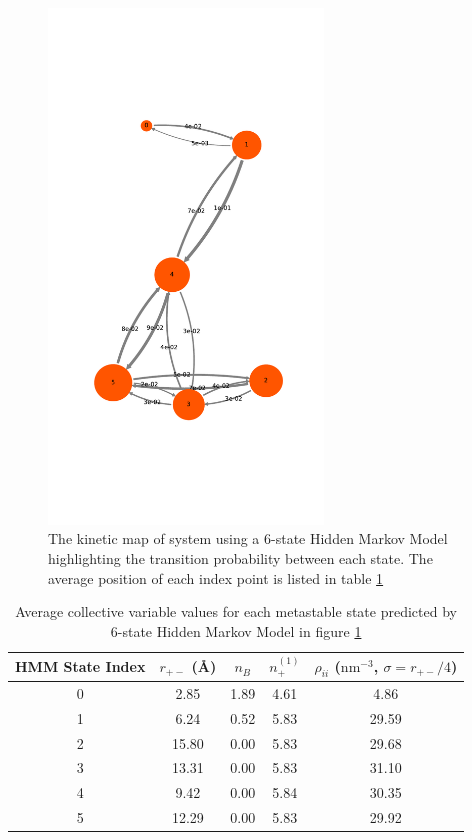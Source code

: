 \begin{spacing}{2.0}
    \begin{figure}[t]
        \centering
        \includegraphics[width=0.65\textwidth]{./figs/fig3-05}
        \caption{The kinetic map of  system using a 6-state Hidden Markov Model highlighting the transition probability between 
                 each state. The average position of each index point is listed in table \ref{tab:metastable-state-indices}}
        \label{fig:hmm-6states-kineticsmodel}
    \end{figure}

    \begin{table}[h]
        \centering
        \caption{Average collective variable values for each metastable state predicted by 6-state Hidden Markov Model in figure \ref{fig:hmm-6states-kineticsmodel}}
        \label{tab:metastable-state-indices}
        \begin{tabular}{|c|c|c|c|c|}
            \hline
            \textbf{HMM State Index} & $r_{+-}$ (\r{A}) & $n_B$ & $n_+^{(1)}$ & $\rho_{ii}$ ($\mathrm{nm}^{-3}$, $\sigma = r_{+-}/4$) \\ \hline
            0 & 2.85 & 1.89 & 4.61 & 4.86 \\
            1 & 6.24 & 0.52 & 5.83 & 29.59 \\
            2 & 15.80 & 0.00 & 5.83 & 29.68 \\
            3 & 13.31 & 0.00 & 5.83 & 31.10 \\
            4 & 9.42 & 0.00 & 5.84 & 30.35 \\
            5 & 12.29 & 0.00 & 5.83 & 29.92 \\ \hline
        \end{tabular}
    \end{table}


\end{spacing}

